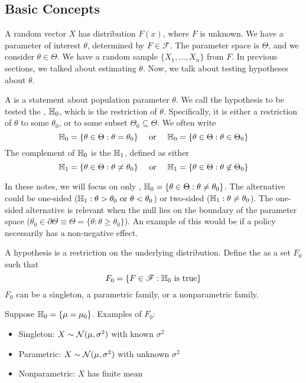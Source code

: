 \documentclass[10pt]{article}
\begin{document}
\subsection{Basic Concepts}

A random vector $X$ has distribution $F(x)$, where $F$ is unknown. We have a parameter of interest $\theta$, determined by $F \in \mathscr{F}$. The parameter space is $\Theta$, and we consider $\theta \in \Theta$. We have a random sample $\{X_1,\dots,X_n\}$ from $F$. In previous sections, we talked about estimating $\theta$. Now, we talk about testing hypotheses about $\theta$. 

\begin{definition}
	A  is a statement about population parameter $\theta$. We call the hypothesis to be tested the , $\mathbb{H}_0$, which is the restriction of $\theta$. Specifically, it is either a restriction of $\theta$ to some $\theta_0$, or to some subset $\Theta_0 \subseteq \Theta$. We often write
	\[
	\mathbb{H}_0 = \{\theta \in \Theta : \theta = \theta_0\} \quad \text{ or } \quad \mathbb{H}_0 = \{\theta \in \Theta : \theta \in \Theta_0\}
	\]
	The complement of $\mathbb{H}_0$ is the  $\mathbb{H}_1$, defined as either
	\[
	\mathbb{H}_1 = \{\theta \in \Theta : \theta \ne \theta_0\} \quad \text{ or } \quad \mathbb{H}_1 = \{\theta \in \Theta : \theta \not\in \Theta_0\}
	\]
\end{definition}

\begin{remark}
	In these notes, we will focus on only , \ie $\mathbb{H}_0 = \{\theta \in \Theta : \theta \ne \theta_0\}$. The alternative could be one-sided ($\mathbb{H}_1 : \theta > \theta_0 \text{ or } \theta < \theta_0$) or two-sided ($\mathbb{H}_1 : \theta \ne \theta_0$). The one-sided alternative is relevant when the null lies on the boundary of the parameter space ($\theta_0 \in \partial \Theta \equiv \Theta = \{\theta : \theta \ge \theta_0\}$). An example of this would be if a policy necessarily has a non-negative effect. 
\end{remark}

\begin{definition}
	A hypothesis is a restriction on the underlying distribution. Define the  as a set $F_0$ such that
	\[
	F_0 = \{F \in \mathscr{F} : \mathbb{H}_0 \text{ is true}\}
	\]
	$F_0$ can be a singleton, a parametric family, or a nonparametric family.
\end{definition}

\begin{example}
	Suppose $\mathbb{H}_0 = \{\mu = \mu_0\}$. Examples of $F_0$:
	\begin{itemize}
		\item Singleton: $X \sim \mathcal{N}(\mu,\sigma^2)$ with known $\sigma^2$
		\item Parametric: $X \sim \mathcal{N}(\mu,\sigma^2)$ with unknown $\sigma^2$
		\item Nonparametric: $X$ has finite mean
	\end{itemize}
\end{example}
\end{document}
